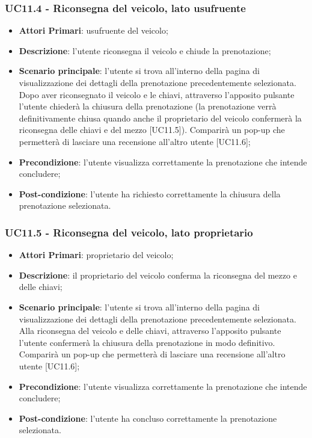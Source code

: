 \subsubsection{UC11.4 - Riconsegna del veicolo, lato usufruente}
\begin{itemize}
	\item \textbf{Attori Primari}: usufruente del veicolo;
	\item \textbf{Descrizione}: l'utente riconsegna il veicolo e chiude la prenotazione;
	\item \textbf{Scenario principale}: l'utente si trova all'interno della pagina di visualizzazione dei dettagli della prenotazione precedentemente selezionata. Dopo aver riconsegnato il veicolo e le chiavi, attraverso l'apposito pulsante l'utente chiederà la chiusura della prenotazione (la prenotazione verrà definitivamente chiusa quando anche il proprietario del veicolo confermerà la riconsegna delle chiavi e del mezzo [UC11.5]). Comparirà un pop-up che permetterà di lasciare una recensione all'altro utente [UC11.6];
	\item \textbf{Precondizione}: l'utente visualizza correttamente la prenotazione che intende concludere;
	\item \textbf{Post-condizione}: l'utente ha richiesto correttamente la chiusura della prenotazione selezionata.
	
\end{itemize}

\subsubsection{UC11.5 - Riconsegna del veicolo, lato proprietario}
\begin{itemize}
	\item \textbf{Attori Primari}: proprietario del veicolo;
	\item \textbf{Descrizione}: il proprietario del veicolo conferma la riconsegna del mezzo e delle chiavi;
	\item \textbf{Scenario principale}: l'utente si trova all'interno della pagina di visualizzazione dei dettagli della prenotazione precedentemente selezionata. Alla riconsegna del veicolo e delle chiavi, attraverso l'apposito pulsante l'utente confermerà la chiusura della prenotazione in modo definitivo. Comparirà un pop-up che permetterà di lasciare una recensione all'altro utente [UC11.6];
	\item \textbf{Precondizione}: l'utente visualizza correttamente la prenotazione che intende concludere;
	\item \textbf{Post-condizione}: l'utente ha concluso correttamente la prenotazione selezionata.
\end{itemize}

